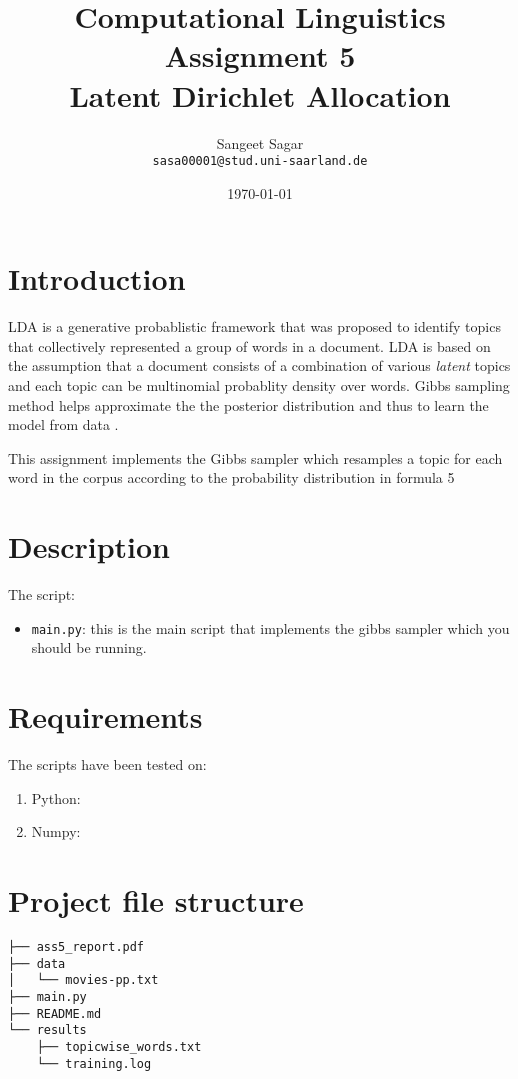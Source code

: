 \documentclass{article}[a4paper]
\title{\textbf{Computational Linguistics} \\
Assignment 5\\
Latent Dirichlet Allocation 
}
\author{Sangeet Sagar\\
            \texttt{sasa00001@stud.uni-saarland.de}
}
\date{\today}
\begin{document}
\maketitle
\section{Introduction}
LDA is a generative probablistic framework that was proposed to identify topics that collectively represented a group of words in a document. LDA is based on the assumption that a document consists of a combination of various \textit{latent} topics and each topic can be multinomial probablity density over words. Gibbs sampling method helps approximate the the posterior distribution and thus to learn the model from data \citep{Darling2011}.

This assignment implements the Gibbs sampler which resamples a topic for each word in the corpus according to the probability distribution in formula 5 \citep{Griffiths5228}

\section{Description}
The script:
\begin{itemize}
    \item \texttt{main.py}: this is the main script that implements the gibbs sampler  which you should be running.
\end{itemize}

\section{Requirements}
The scripts have been tested on:
\begin{enumerate}
    \item Python: 
    \item Numpy: 
\end{enumerate}

\section{Project file structure}
\begin{Verbatim}
├── ass5_report.pdf
├── data
│   └── movies-pp.txt
├── main.py
├── README.md
└── results
    ├── topicwise_words.txt
    └── training.log


 \end{Verbatim}
\end{document}
